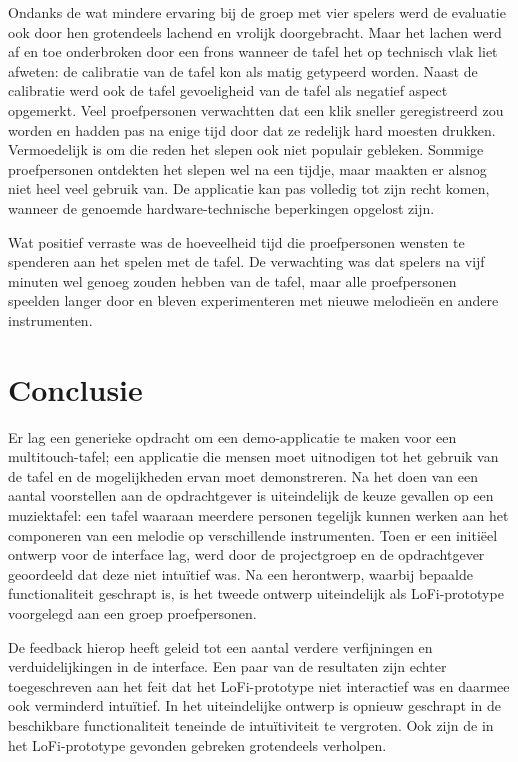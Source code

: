 \documentclass{acm}
\begin{document}
Ondanks de wat mindere ervaring bij de groep met vier spelers werd de evaluatie ook door hen grotendeels lachend en vrolijk doorgebracht. Maar het lachen werd af en toe onderbroken door een frons wanneer de tafel het op technisch vlak liet afweten: de calibratie van de tafel kon als matig getypeerd worden. Naast de calibratie werd ook de tafel gevoeligheid van de tafel als negatief aspect opgemerkt. Veel proefpersonen verwachtten dat een klik sneller geregistreerd zou worden en hadden pas na enige tijd door dat ze redelijk hard moesten drukken. Vermoedelijk is om die reden het slepen ook niet populair gebleken. Sommige proefpersonen ontdekten het slepen wel na een tijdje, maar maakten er alsnog niet heel veel gebruik van. De applicatie kan pas volledig tot zijn recht komen, wanneer de genoemde hardware-technische beperkingen opgelost zijn.

Wat positief verraste was de hoeveelheid tijd die proefpersonen wensten te spenderen aan het spelen met de tafel. De verwachting was dat spelers na vijf minuten wel genoeg zouden hebben van de tafel, maar alle proefpersonen speelden langer door en bleven experimenteren met nieuwe melodie\"en en andere instrumenten.


\section{Conclusie}
\label{sec_conclusie}
Er lag een generieke opdracht om een demo-applicatie te maken voor een multitouch-tafel; een applicatie die mensen moet uitnodigen tot het gebruik van de tafel en de mogelijkheden ervan moet demonstreren. Na het doen van een aantal voorstellen aan de opdrachtgever is uiteindelijk de keuze gevallen op een muziektafel: een tafel waaraan meerdere personen tegelijk kunnen werken aan het componeren van een melodie op verschillende instrumenten. Toen er een initi\"eel ontwerp voor de interface lag, werd door de projectgroep en de opdrachtgever geoordeeld dat deze niet intu\"itief was. Na een herontwerp, waarbij bepaalde functionaliteit geschrapt is, is het tweede ontwerp uiteindelijk als LoFi-prototype voorgelegd aan een groep proefpersonen.

De feedback hierop heeft geleid tot een aantal verdere verfijningen en verduidelijkingen in de interface. Een paar van de resultaten zijn echter toegeschreven aan het feit dat het LoFi-prototype niet interactief was en daarmee ook verminderd intu\"itief. In het uiteindelijke ontwerp is opnieuw geschrapt in de beschikbare functionaliteit teneinde de intu\"itiviteit te vergroten. Ook zijn de in het LoFi-prototype gevonden gebreken grotendeels verholpen.
\end{document}

